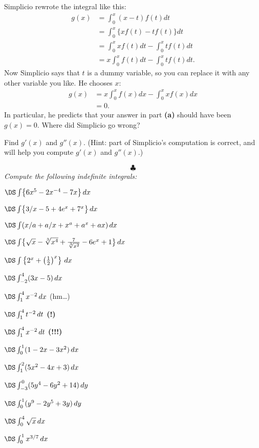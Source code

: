 \begin{multicols}{2}
\subprob Simplicio rewrote the integral like this:
\begin{align*}
  g(x) &= \int_0^x (x-t) f(t) dt\\
  &= \int_0^x \bigl\{xf(t) -tf(t)\bigr\} dt \\
  &=  \int_0^x xf(t)dt -\int_0^x tf(t) dt \\
  &=  x\int_0^x f(t)dt -\int_0^x tf(t) dt .
\end{align*}
Now Simplicio says that $t$ is a dummy variable, so you can replace it with any
other variable you like.  He chooses $x$:
\begin{align*}
  g(x) & =  x\int_0^x f(x)dx -\int_0^x xf(x) dx \\
  &=0.
\end{align*}
In particular, he predicts that your answer in part \textbf{(a)} should have
been $g(x) = 0$.  Where did Simplicio go wrong?

\subprob Find $g'(x)$ and $g''(x)$. (Hint: part of Simplicio's computation is
correct, and will help you compute $g'(x)$ and $g''(x)$.)


\[
\clubsuit
\]
\begingroup
\itshape Compute the following indefinite integrals:
\endgroup

\problem $\DS \int \bigl\{6x^5-2x^{-4}-7x\bigr\}\,dx$

\problem $\DS\int \bigl\{3/x-5+4e^x+7^x\bigr\} \,dx$

\problem $\DS \int (x/a+a/x+x^a+a^x+ax) \,dx $

\problem $\DS\int \bigl\{\sqrt{x}- \sqrt[3]{x^4}+\frac{7}{\sqrt[3]{x^2}}
-6e^x+1\bigr\} \,dx $

\problem $\DS\int \left\{2^x+\bigl(\tfrac12\bigr)^x\right\} \,dx$

\problem $\DS\int^4_{-2} (3x-5) \,dx$

\problem $\DS \int^4_{1} x^{-2} \,dx$
\qquad\textsf{(hm\dots)}\hfill

\problem $\DS \int^4_{1} t^{-2} \,dt$ \qquad\textbf{(!)}\hfill

\problem $\DS \int^4_{1} x^{-2} \,dt$ \qquad\textbf{(!!!)}\hfill

\problem $\DS \int^1_{0} (1-2x-3x^2) \,dx$

\problem $\DS \int^2_1 (5x^2-4x+3) \,dx$

\problem $\DS \int^0_{-3} (5y^4-6y^2+14) \,dy$

\problem $\DS \int^1_{0} (y^9-2y^5+3y) \,dy$

\problem $\DS \int^4_0 \sqrt{x} \,dx$

\problem $\DS \int^1_0 x^{3/7} \,dx$


\end{multicols}
